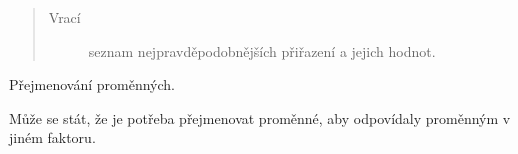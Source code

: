 \begin{fulllineitems}
\begin{fulllineitems}
\begin{quote}
\begin{description}
\item[{Vrací}] \leavevmode
seznam nejpravděpodobnějších přiřazení a jejich hodnot.

\end{description}\end{quote}

\end{fulllineitems}


\begin{fulllineitems}
\label{alex.infer:alex.infer.factor.Factor.rename_variables}
Přejmenování proměnných.

Může se stát, že je potřeba přejmenovat proměnné, aby odpovídaly proměnným v jiném faktoru.


\end{fulllineitems}
\end{fulllineitems}
